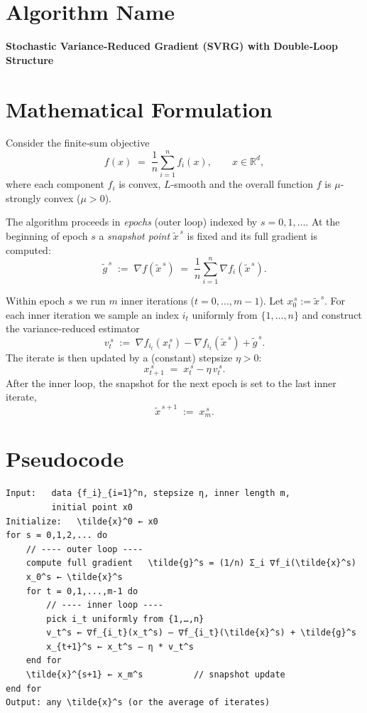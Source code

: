 \documentclass{article}
\newcommand{\R}{\mathbb{R}}
\newcommand{\grad}{\nabla}
\begin{document}
\section*{Algorithm Name}
\textbf{Stochastic Variance‑Reduced Gradient (SVRG) with Double‑Loop Structure}

\section*{Mathematical Formulation}
Consider the finite‑sum objective
\[
f(x)\;=\;\frac{1}{n}\sum_{i=1}^{n} f_i(x),\qquad x\in\R^{d},
\]
where each component \(f_i\) is convex, \(L\)-smooth and the overall function \(f\) is \(\mu\)-strongly convex (\(\mu>0\)).  

The algorithm proceeds in \emph{epochs} (outer loop) indexed by \(s=0,1,\dots\).  
At the beginning of epoch \(s\) a \emph{snapshot point} \(\tilde{x}^{\,s}\) is fixed and its full gradient is computed:
\[
\tilde{g}^{\,s}\;:=\;\grad f(\tilde{x}^{\,s})\;=\;\frac{1}{n}\sum_{i=1}^{n}\grad f_i(\tilde{x}^{\,s}).
\]

Within epoch \(s\) we run \(m\) inner iterations (\(t=0,\dots,m-1\)).  
Let \(x_{0}^{\,s}:=\tilde{x}^{\,s}\). For each inner iteration we sample an index
\(i_t\) uniformly from \(\{1,\dots,n\}\) and construct the variance‑reduced estimator
\[
v_t^{\,s}\;:=\;\grad f_{i_t}(x_{t}^{\,s})-\grad f_{i_t}(\tilde{x}^{\,s})+\tilde{g}^{\,s}.
\]
The iterate is then updated by a (constant) stepsize \(\eta>0\):
\[
x_{t+1}^{\,s}\;=\;x_{t}^{\,s}-\eta\,v_t^{\,s}.
\tag{1}
\]
After the inner loop, the snapshot for the next epoch is set to the last inner iterate,
\[
\tilde{x}^{\,s+1}\;:=\;x_{m}^{\,s}.
\tag{2}
\]

\section*{Pseudocode}
\begin{verbatim}
Input:   data {f_i}_{i=1}^n, stepsize η, inner length m,
         initial point x0
Initialize:   \tilde{x}^0 ← x0
for s = 0,1,2,... do
    // ---- outer loop ----
    compute full gradient   \tilde{g}^s = (1/n) Σ_i ∇f_i(\tilde{x}^s)
    x_0^s ← \tilde{x}^s
    for t = 0,1,...,m-1 do
        // ---- inner loop ----
        pick i_t uniformly from {1,…,n}
        v_t^s ← ∇f_{i_t}(x_t^s) – ∇f_{i_t}(\tilde{x}^s) + \tilde{g}^s
        x_{t+1}^s ← x_t^s – η * v_t^s
    end for
    \tilde{x}^{s+1} ← x_m^s          // snapshot update
end for
Output: any \tilde{x}^s (or the average of iterates)
\end{verbatim}
\end{document}
